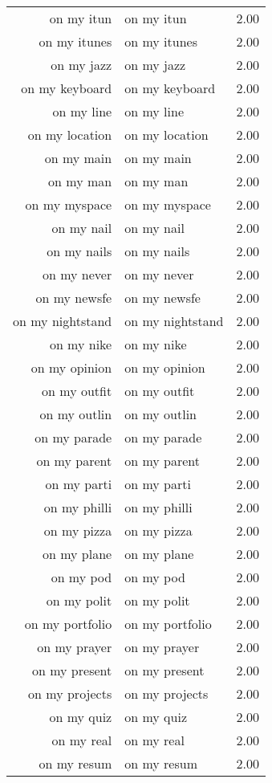 \begin{table}[ht]
\begin{tabular}{rlr}
  on my itun & on my itun & 2.00 \\ 
  on my itunes & on my itunes & 2.00 \\ 
  on my jazz & on my jazz & 2.00 \\ 
  on my keyboard & on my keyboard & 2.00 \\ 
  on my line & on my line & 2.00 \\ 
  on my location & on my location & 2.00 \\ 
  on my main & on my main & 2.00 \\ 
  on my man & on my man & 2.00 \\ 
  on my myspace & on my myspace & 2.00 \\ 
  on my nail & on my nail & 2.00 \\ 
  on my nails & on my nails & 2.00 \\ 
  on my never & on my never & 2.00 \\ 
  on my newsfe & on my newsfe & 2.00 \\ 
  on my nightstand & on my nightstand & 2.00 \\ 
  on my nike & on my nike & 2.00 \\ 
  on my opinion & on my opinion & 2.00 \\ 
  on my outfit & on my outfit & 2.00 \\ 
  on my outlin & on my outlin & 2.00 \\ 
  on my parade & on my parade & 2.00 \\ 
  on my parent & on my parent & 2.00 \\ 
  on my parti & on my parti & 2.00 \\ 
  on my philli & on my philli & 2.00 \\ 
  on my pizza & on my pizza & 2.00 \\ 
  on my plane & on my plane & 2.00 \\ 
  on my pod & on my pod & 2.00 \\ 
  on my polit & on my polit & 2.00 \\ 
  on my portfolio & on my portfolio & 2.00 \\ 
  on my prayer & on my prayer & 2.00 \\ 
  on my present & on my present & 2.00 \\ 
  on my projects & on my projects & 2.00 \\ 
  on my quiz & on my quiz & 2.00 \\ 
  on my real & on my real & 2.00 \\ 
  on my resum & on my resum & 2.00 \\ 

\end{tabular}
\end{table}
